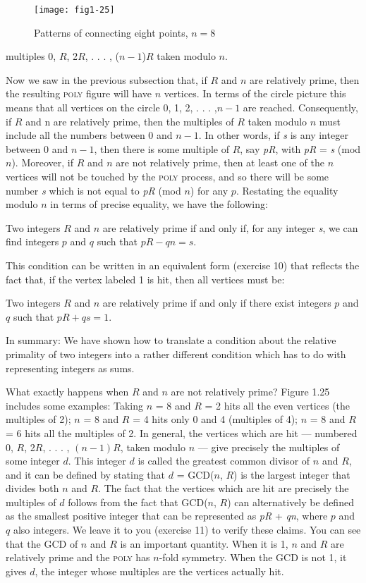 \documentclass{book}
\begin{document}
\begin{figure}
\begin{center}
\texttt{[image: fig1-25]}
\caption{Patterns of connecting eight points, $n = 8$}
\end{center}
\end{figure}


multiples 0, $R$, 2$R$, . . . , ($n - 1$)$R$ taken modulo $n$.

Now we saw in the previous subsection that, if $R$ and $n$ are relatively
prime, then the resulting \textsc{poly} figure will have $n$ vertices. In terms of the
circle picture this means that all vertices on the circle 0, 1, 2, . . . ,$n - 1$
are reached. Consequently, if $R$ and n are relatively prime, then the
multiples of $R$ taken modulo $n$ must include all the numbers between 0
and $n - 1$. In other words, if {\em s} is any integer between 0 and $n - 1$, then
there is some multiple of $R$, say {\em pR}, with {\em pR} = {\em s} (mod $n$). Moreover, if
$R$ and $n$ are not relatively prime, then at least one of the $n$ vertices will
not be touched by the \textsc{poly} process, and so there will be some number
{\em s} which is not equal to {\em pR} (mod $n$) for any $p$. Restating the equality
modulo $n$ in terms of precise equality, we have the following: 

Two integers $R$ and $n$ are relatively prime if and only if, for any integer
{\em s}, we can find integers $p$ and $q$ such that $pR - qn = s$.

This condition can be written in an equivalent form (exercise 10) that
reflects the fact that, if the vertex labeled 1 is hit, then all vertices must
be:

Two integers $R$ and $n$ are relatively prime if and only if there exist
integers $p$ and $q$ such that $pR + qs = 1$.

In summary: We have shown how to translate a condition about the
relative primality of two integers into a rather different condition which
has to do with representing integers as sums.

What exactly happens when $R$ and $n$ are not relatively prime? Figure 
1.25 includes some examples: Taking $n$ = 8 and $R$ = 2 hits all the
even vertices (the multiples of 2); $n$ = 8 and $R$ = 4 hits only 0 and
4 (multiples of 4); $n$ = 8 and $R$ = 6 hits all the multiples of 2. In
general, the vertices which are hit --- numbered 0, $R$, 2$R$, . . . , $(n - 1)R$,
taken modulo $n$ --- give precisely the multiples of some integer $d$. This
integer $d$ is called the greatest common divisor of $n$ and $R$, and it can be
defined by stating that $d$ = GCD($n$, $R$) is the largest integer that divides
both $n$ and $R$. The fact that the vertices which are hit are precisely the
multiples of $d$ follows from the fact that GCD($n$, $R$) can alternatively
be defined as the smallest positive integer that can be represented as
{\em pR} + {\em qn}, where $p$ and $q$ also integers. We leave it to you (exercise 11)
to verify these claims. You can see that the GCD of $n$ and $R$ is an
important quantity. When it is 1, $n$ and $R$ are relatively prime and
the \textsc{poly} has $n$-fold symmetry. When the GCD is not 1, it gives $d$, the
integer whose multiples are the vertices actually hit.
\end{document}
